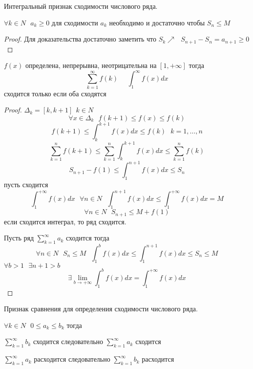 \begin{title}[\Large]
  Интегральный признак сходимости числового ряда.
\end{title}

\begin{block}[Критерий]
  $
  \forall k \in N ~~~
  a_k \ge 0
  $
  для сходимости $a_k$ необходимо и достаточно чтобы $S_n \le M$
\end{block}

\begin{proof}
  Для доказательства достаточно заметить что
  $S_k \nearrow ~~~ S_{n+1} - S_n = a_{n+1} \ge 0$
\end{proof}

\begin{block}
  $f(x)$ определена, непрерывна, неотрицательна на $[1, +\infty]$ тогда
  $$
  \sum_{k=1}^{\infty} f(k) ~~~~~~ \int_1^{\infty} f(x)dx
  $$
  сходится только если оба сходятся
\end{block}

\begin{proof}
  $\Delta_k = [k, k+1] ~~ k \in N$
  $$
  \forall x \in \Delta_k ~~~ f(k+1) \le f(x) \le f(k)
  $$
  $$
  f(k+1) \le \int_k^{k+1} f(x)dx \le f(k) ~~~ k = 1, \ldots, n
  $$
  $$
  \sum_{k=1}^n f(k+1) \le \sum_{k=1}^n \int_k^{k+1} f(x)dx \le \sum_{k=1}^n f(k)
  $$
  $$
  S_{n+1} - f(1) \le \int_1^{n+1} f(x)dx \le S_n
  $$
  пусть сходится
  $$
  \int_1^{+\infty} f(x)dx ~~~ \forall n \in N ~~~
  \int_1^{n+1} f(x)dx \le \int_1^{+\infty} f(x) dx = M
  $$
  $$
  \forall n \in N ~~~ S_{n+1} \le M + f(1)
  $$
  если сходится интеграл, то ряд сходится.

  Пусть ряд $\sum_{k=1}^{\infty} a_k$ сходится тогда
  $$
  \forall n \in N ~~~
  S_n \le M ~~~
  \int_1^b f(x)dx \le \int_1^{n+1} f(x)dx \le S_n \le M
  $$
  $\forall b>1 ~~~ \exists n+1 > b$
  $$
  \exists \lim_{b \to +\infty} \int_1^b f(x)dx = \int_1^{+ \infty} f(x)dx
  $$
\end{proof}

\begin{title}
  Признак сравнения для определения сходимости числового ряда.
\end{title}

\begin{block}
  $\forall k \in N ~~~ 0 \le a_k \le b_k$ тогда

  $\sum_{k=1}^{\infty} b_k$ сходится следовательно $\sum_{k=1}^{\infty} a_k$
  сходится

  $\sum_{k=1}^{\infty} a_k$ расходится следовательно $\sum_{k=1}^{\infty} b_k$
  расходится
\end{block}

